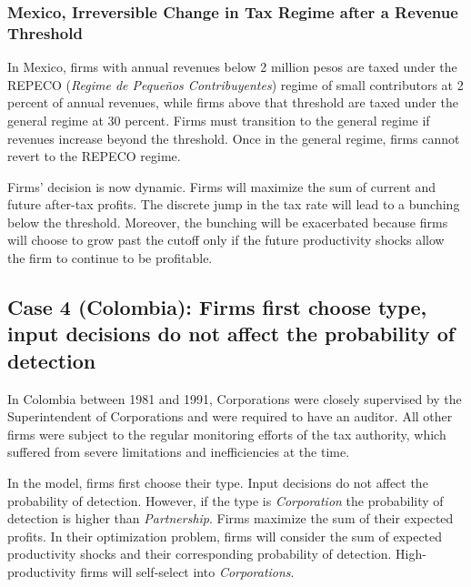 \documentclass[
  12pt]{article}
\theoremstyle{definition}
\theoremstyle{remark}
\begin{document}
\subsubsection{Mexico, Irreversible Change in Tax Regime after a Revenue
Threshold}\label{mexico-irreversible-change-in-tax-regime-after-a-revenue-threshold}

In Mexico, firms with annual revenues below 2 million pesos are taxed
under the REPECO (\emph{Regime de Pequeños Contribuyentes}) regime of
small contributors at 2 percent of annual revenues, while firms above
that threshold are taxed under the general regime at 30 percent. Firms
must transition to the general regime if revenues increase beyond the
threshold. Once in the general regime, firms cannot revert to the REPECO
regime.

Firms' decision is now dynamic. Firms will maximize the sum of current
and future after-tax profits. The discrete jump in the tax rate will
lead to a bunching below the threshold. Moreover, the bunching will be
exacerbated because firms will choose to grow past the cutoff only if
the future productivity shocks allow the firm to continue to be
profitable.

\subsection{Case 4 (Colombia): Firms first choose type, input decisions
do not affect the probability of
detection}\label{case-4-colombia-firms-first-choose-type-input-decisions-do-not-affect-the-probability-of-detection}

In Colombia between 1981 and 1991, Corporations were closely supervised
by the Superintendent of Corporations and were required to have an
auditor. All other firms were subject to the regular monitoring efforts
of the tax authority, which suffered from severe limitations and
inefficiencies at the time.

In the model, firms first choose their type. Input decisions do not
affect the probability of detection. However, if the type is
\emph{Corporation} the probability of detection is higher than
\emph{Partnership}. Firms maximize the sum of their expected profits. In
their optimization problem, firms will consider the sum of expected
productivity shocks and their corresponding probability of detection.
High-productivity firms will self-select into \emph{Corporations}.
\end{document}
